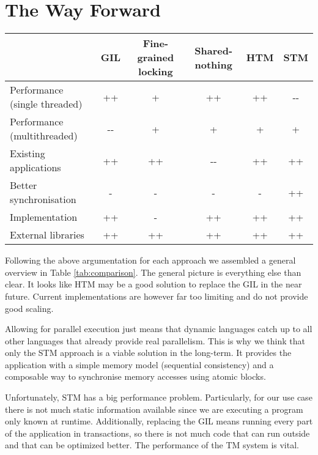 \documentclass{sigplanconf}
\begin{document}
\section{The Way Forward}

\begin{table*}[h]
  \centering
  \begin{tabular}{|l|c|c|c|c|c|}
    \hline
    & \textbf{GIL} & \textbf{Fine-grained locking}
    & \textbf{Shared-nothing} & \textbf{HTM} & \textbf{STM}\\
    \hline
    Performance (single threaded) & ++   & +  & ++   & ++ & -{-} \\
    \hline
    Performance (multithreaded)   & -{-} & +  & +    & +  & +    \\
    \hline
    Existing applications         & ++   & ++ & -{-} & ++ & ++   \\
    \hline
    Better synchronisation        & -    & -  & -    & -  & ++   \\
    \hline
    Implementation                & ++   & -  & ++   & ++ & ++   \\
    \hline
    External libraries            & ++   & ++ & ++   & ++ & ++   \\
    \hline
  \end{tabular}
  \caption{Comparison between the approaches (-{-}/-/o/+/++)}
  \label{tab:comparison}
\end{table*}


Following the above argumentation for each approach we assembled a
general overview in Table \ref{tab:comparison}. The general picture is
everything else than clear. It looks like HTM may be a good solution
to replace the GIL in the near future. Current implementations are
however far too limiting and do not provide good scaling.

Allowing for parallel execution just means that dynamic languages
catch up to all other languages that already provide real
parallelism. This is why we think that only the STM approach is a
viable solution in the long-term. It provides the application with a
simple memory model (sequential consistency) and a composable way to
synchronise memory accesses using atomic blocks.

Unfortunately, STM has a big performance problem. Particularly, for
our use case there is not much static information available since we
are executing a program only known at runtime. Additionally, replacing
the GIL means running every part of the application in transactions,
so there is not much code that can run outside and that can be
optimized better. The performance of the TM system is vital.
\end{document}
